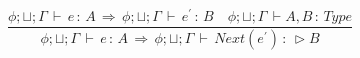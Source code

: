 \[
\frac{ \phi;\sqcup;\Gamma\,\vdash\,e\,:\,A\,\Rightarrow\,\phi;\sqcup;\Gamma\,\vdash\,e{^\prime}\,:\,B \quad \phi;\sqcup;\Gamma\,\vdash A,B\,:\,Type }
     { \phi;\sqcup;\Gamma\,\vdash\,e\,:\,A\,\Rightarrow\,\phi;\sqcup;\Gamma\,\vdash\,Next(e{^\prime})\,:\,\rhd B }
\]